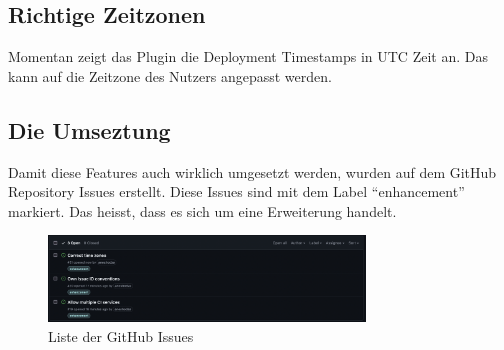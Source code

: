 \subsection{Richtige Zeitzonen}
Momentan zeigt das Plugin die Deployment Timestamps in UTC Zeit an. Das kann auf die Zeitzone des Nutzers
angepasst werden.
\subsection{Die Umseztung}
Damit diese Features auch wirklich umgesetzt werden, wurden auf dem GitHub Repository Issues erstellt. Diese
Issues sind mit dem Label \enquote{enhancement} markiert. Das heisst, dass es sich um eine Erweiterung handelt.
\begin{figure}
    \centering
    \includegraphics[width=0.75\textwidth]{images/misc/issues.png}
    \caption[Ein Screenshot von den aufgelisteten GitHub Issues]{Liste der GitHub Issues}
    \label{fig:issues}
\end{figure}
